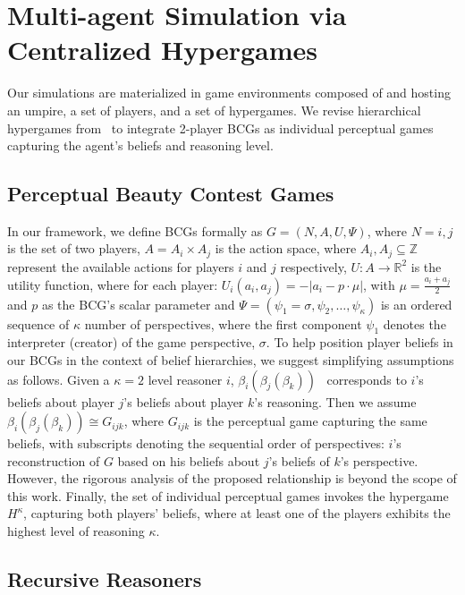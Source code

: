\documentclass[runningheads]{llncs}
\begin{document}
\section{Multi-agent Simulation via Centralized Hypergames}

Our simulations are materialized in game environments composed of and hosting an umpire, a set of players, and a set of hypergames. We revise hierarchical hypergames from~\cite{Wang1988} to integrate 2-player BCGs as individual perceptual games capturing the agent's beliefs and reasoning level.

\subsection{Perceptual Beauty Contest Games}

In our framework, we define BCGs formally as $G=(N,A,U,\Psi)$, where $N={i,j}$ is the set of two players, $A = A_i \times A_j$ is the action space, where $A_i, A_j \subseteq \mathbb{Z}$ represent the available actions for players $i$ and $j$ respectively, $U: A \rightarrow \mathbb{R}^2$ is the utility function, where for each player:
$U_i(a_i,a_j) = -|a_i - p \cdot \mu|$, with $\mu = \frac{a_i + a_j}{2}$ and $p$ as the BCG's scalar parameter and $\Psi=(\psi_1=\sigma,\psi_2,\ldots,\psi_\kappa)$ is an ordered sequence of $\kappa$ number of perspectives, where the first component $\psi_1$ denotes the interpreter (creator) of the game perspective, $\sigma$. To help position player beliefs in our BCGs in the context of belief hierarchies, we suggest simplifying assumptions as follows. Given a $\kappa=2$ level reasoner $i$, $\beta_i(\beta_j(\beta_k))$~\cite{dekel2015epistemic} corresponds to $i$'s beliefs about player $j$'s beliefs about player $k$'s reasoning. Then we assume $\beta_i(\beta_j(\beta_k)) \cong G_{ijk}$, where $G_{ijk}$ is the perceptual game capturing the same beliefs, with subscripts denoting the sequential order of perspectives: $i$'s reconstruction of $G$ based on his beliefs about $j$'s beliefs of $k$'s perspective. However, the rigorous analysis of the proposed relationship is beyond the scope of this work. Finally, the set of individual perceptual games invokes the hypergame $H^{\kappa}$, capturing both players' beliefs, where at least one of the players exhibits the highest level of reasoning $\kappa$.


\subsection{Recursive Reasoners}
\end{document}
